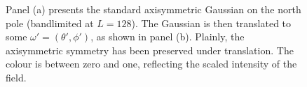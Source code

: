 \begin{figure}[htpb]
	\centering\capstart{}
	\hfill
	\caption[
		A Gaussian on the north pole and then translated
	]{
		Panel (a) presents the standard axisymmetric Gaussian on the north pole (bandlimited at \(L=128\)).
		The Gaussian is then translated to some \(\omega'=(\theta',\phi')\), as shown in panel (b).
		Plainly, the axisymmetric symmetry has been preserved under translation.
		The colour is between zero and one, reflecting the scaled intensity of the field.
	}\label{fig:chapter3_gaussian}
\end{figure}
